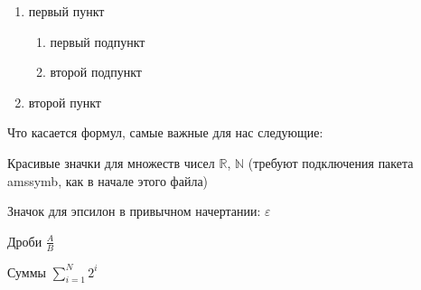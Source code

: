 \documentclass{article}
\begin{document}
\begin{enumerate}
    \item первый пункт
    \begin{enumerate}
        \item первый подпункт
        \item второй подпункт
    \end{enumerate}

    \item второй пункт
\end{enumerate}

Что касается формул, самые важные для нас следующие:

Красивые значки для множеств чисел $\mathbb{R}$, $\mathbb{N}$ (требуют подключения пакета amssymb, как в начале этого файла)

Значок для эпсилон в привычном начертании: $\varepsilon$

Дроби $\frac{A}{B}$

Суммы $\sum\limits_{i=1}^N 2^i$
\end{document}

